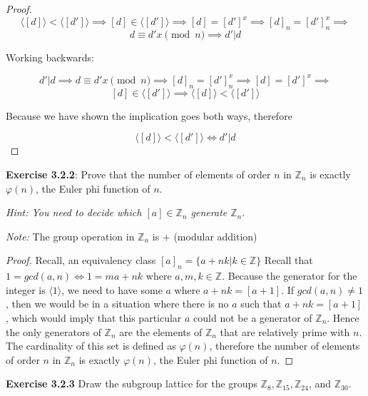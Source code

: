\documentclass[a4paper]{article}
\begin{document}
\begin{myparindent}{0pt}
\begin{proof}
\[ \langle [d] \rangle < \langle [d'] \rangle \implies [d] \in \langle [d'] \rangle \implies [d] = [d']^x \implies [d]_n = [d']_n^x \implies \]
\[ d \equiv d'x \pmod n \implies d' | d \]

Working backwards:

\[ d' | d \implies d \equiv d'x \pmod n \implies [d]_n = [d']_n^x \implies [d] = [d']^x \implies \]
\[ [d] \in \langle [d'] \rangle \implies \langle [d] \rangle < \langle [d'] \rangle \]

Because we have shown the implication goes both ways, therefore

\[ \langle [d] \rangle < \langle [d'] \rangle \iff d'|d \]
\end{proof}

\textbf{Exercise 3.2.2}:
Prove that the number of elements of order $n$ in $\mathbb{Z}_n$ is exactly
$\varphi(n)$, the Euler phi function of $n$.

\textit{Hint: You need to decide which $[a] \in \mathbb{Z}_n$ generate $\mathbb{Z}_n$}.
\newline

\textit{Note:} The group operation in $\mathbb{Z}_n$ is $+$ (modular addition)
\newline

\begin{proof}
  Recall, an equivalency class $[a]_n = \{ a + nk | k \in \mathbb{Z} \}$
  Recall that $1 = gcd(a, n) \iff 1 = ma + nk$ where $a, m, k \in \mathbb{Z}$.
  Because the generator for the integer is $\langle 1 \rangle$, we need to have
  some $a$ where $a + nk = [a + 1]$. If $gcd(a, n) \neq 1$, then we would be in
  a situation where there is no $a$ such that $a + nk = [a + 1]$, which would
  imply that this particular $a$ could not be a generator of $\mathbb{Z}_n$.
  Hence the only generators of $\mathbb{Z}_n$ are the elements of $\mathbb{Z}_n$
  that are relatively prime with $n$. The cardinality of this set is defined as
  $\varphi(n)$, therefore the number of elements of order $n$ in $\mathbb{Z}_n$
  is exactly $\varphi(n)$, the Euler phi function of $n$.
\end{proof}

\textbf{Exercise 3.2.3}
Draw the subgroup lattice for the groups
$\mathbb{Z}_8, \mathbb{Z}_{15}, \mathbb{Z}_{24}$, and $\mathbb{Z}_{30}$.
\newline


\end{myparindent}
\end{document}
